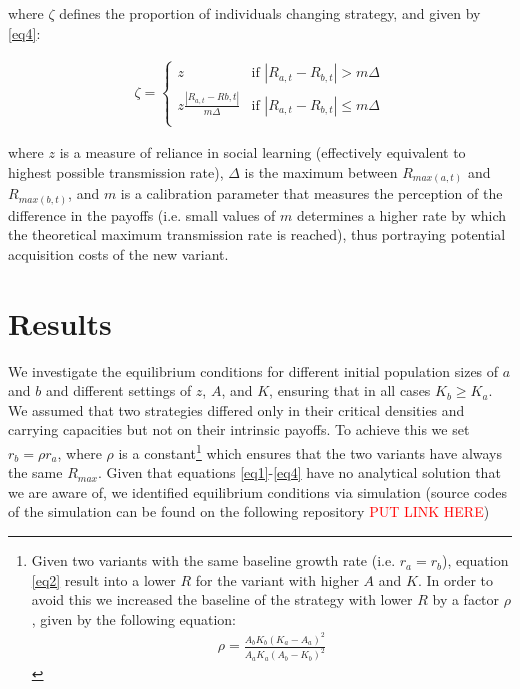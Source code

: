\documentclass[review,authoryear]{elsarticle}
\begin{document}
where $\zeta$ defines the proportion of individuals changing strategy, and given by \eqref{eq4}:

\begin{equation}
\begin{aligned}
\label{eq4}
\zeta = 
\begin{cases}
z& \text{if }|R_{a,t}-R_{b,t}| > m\Delta\\
z\frac{|R_{a,t}-R{b,t}|}{m\Delta}& \text{if }|R_{a,t}-R_{b,t}| \leq m\Delta\\
\end{cases}
\end{aligned}
\end{equation}

where $z$ is a measure of reliance in social learning (effectively equivalent to highest possible transmission rate), $\Delta$ is the maximum between $R_{max(a,t)}$ and $R_{max(b,t)}$, and $m$ is a calibration parameter that measures the perception of the difference in the payoffs (i.e. small values of $m$ determines a higher rate by which the theoretical maximum transmission rate is reached), thus portraying potential acquisition costs of the new variant.

\section{Results}

We investigate the equilibrium conditions for different initial population sizes of $a$ and $b$ and different settings of $z$, $A$, and $K$, ensuring that in all cases $K_b \geq K_a$. We assumed that two strategies differed only in their critical densities and carrying capacities but not on their intrinsic payoffs. To achieve this we set $r_b=\rho r_a$, where $\rho$ is a constant\footnote{Given two variants with the same baseline growth rate (i.e. $r_a=r_b$), equation \eqref{eq2} result into a lower $R$ for the variant with higher $A$ and $K$. In order to avoid this we increased the baseline of the strategy with lower $R$ by a factor $\rho$, given by the following equation:
\begin{align*}
\rho=\frac{A_bK_b(K_a-A_a)^2}{A_aK_a(A_b-K_b)^2}
\end{align*}
  } 
which ensures that the two variants have always the same $R_{max}$. Given that equations \ref{eq1}-\ref{eq4} have no analytical solution that we are aware of, we identified equilibrium conditions via simulation (source codes of the simulation can be found on the following repository \textcolor{red}{PUT LINK HERE})
\end{document}
